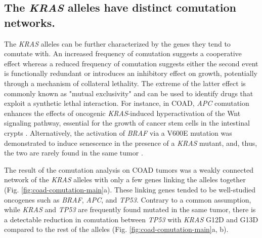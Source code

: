 \documentclass[english, 10pt, letterpaper]{article}
\newcommand{\KRAS}{\emph{KRAS}}
\begin{document}
\subsection*{The \KRAS{} alleles have distinct comutation networks.}

The \KRAS{} alleles can be further characterized by the genes they tend to comutate with.
An increased frequency of comutation suggests a cooperative effect whereas a reduced frequency of comutation suggests either the second event is functionally redundant or introduces an inhibitory effect on growth, potentially through a mechanism of collateral lethality.
The extreme of the latter effect is commonly known as "mutual exclusivity" and can be used to identify drugs that exploit a synthetic lethal interaction.
For instance, in COAD, \emph{APC} comutation enhances the effects of oncogenic \KRAS{}-induced hyperactivation of the Wnt signaling pathway, essential for the growth of cancer stem cells in the intestinal crypts \cite{Janssen2006, Fearon2014, Sakai2018, Jauhri2017}.
Alternatively, the activation of \emph{BRAF} via a V600E mutation was demonstrated to induce senescence in the presence of a \KRAS{} mutant, and, thus, the two are rarely found in the same tumor \cite{Seth2009ConcomitantCancer., Cisowski2016, Jauhri2017}.

The result of the comutation analysis on COAD tumors was a weakly connected network of the \KRAS{} alleles with only a few genes linking the alleles together (Fig. \ref{fig:coad-comutation-main}a).
These linking genes tended to be well-studied oncogenes such as \emph{BRAF}, \emph{APC}, and \emph{TP53}.
Contrary to a common assumption, while \KRAS{} and \emph{TP53} are frequently found mutated in the same tumor, there is a detectable reduction in comutation between \emph{TP53} with \KRAS{} G12D and G13D compared to the rest of the alleles (Fig. \ref{fig:coad-comutation-main}a, b).
\end{document}
